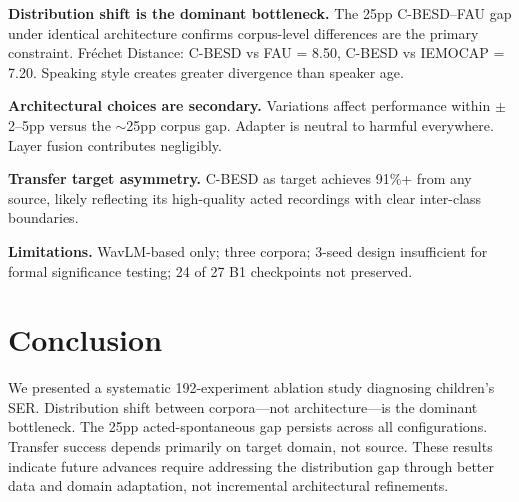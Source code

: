 \documentclass[11pt,a4paper]{article}
\begin{document}
\textbf{Distribution shift is the dominant bottleneck.} The 25pp C-BESD--FAU gap under identical architecture confirms corpus-level differences are the primary constraint. Fr\'{e}chet Distance: C-BESD vs FAU = 8.50, C-BESD vs IEMOCAP = 7.20. Speaking style creates greater divergence than speaker age.

\textbf{Architectural choices are secondary.} Variations affect performance within $\pm$2--5pp versus the $\sim$25pp corpus gap. Adapter is neutral to harmful everywhere. Layer fusion contributes negligibly.

\textbf{Transfer target asymmetry.} C-BESD as target achieves 91\%+ from any source, likely reflecting its high-quality acted recordings with clear inter-class boundaries.

\textbf{Limitations.} WavLM-based only; three corpora; 3-seed design insufficient for formal significance testing; 24 of 27 B1 checkpoints not preserved.

\section{Conclusion}

We presented a systematic 192-experiment ablation study diagnosing children's SER. Distribution shift between corpora---not architecture---is the dominant bottleneck. The 25pp acted-spontaneous gap persists across all configurations. Transfer success depends primarily on target domain, not source. These results indicate future advances require addressing the distribution gap through better data and domain adaptation, not incremental architectural refinements.
\end{document}
